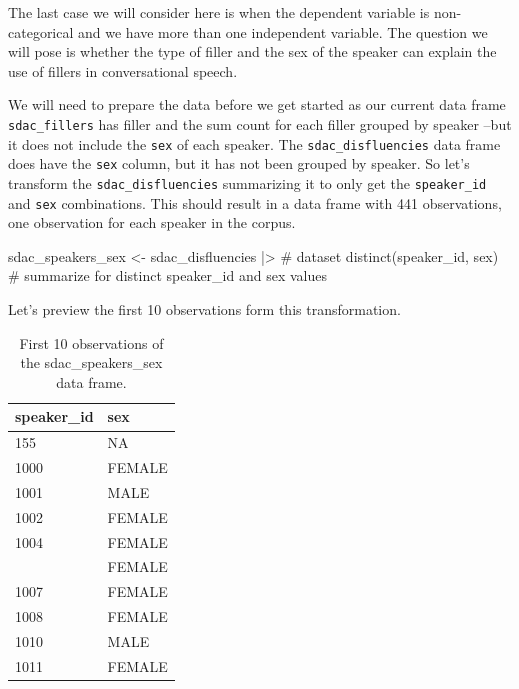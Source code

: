 \documentclass[
  letterpaper,
]{latex/krantz}
\newenvironment{Shaded}{\begin{snugshade}}{\end{snugshade}}
\newcommand{\CommentTok}[1]{\textcolor[rgb]{0.37,0.37,0.37}{#1}}
\newcommand{\FunctionTok}[1]{\textcolor[rgb]{0.28,0.35,0.67}{#1}}
\newcommand{\NormalTok}[1]{\textcolor[rgb]{0.00,0.23,0.31}{#1}}
\newcommand{\OtherTok}[1]{\textcolor[rgb]{0.00,0.23,0.31}{#1}}
\newcommand{\SpecialCharTok}[1]{\textcolor[rgb]{0.37,0.37,0.37}{#1}}
\begin{document}
The last case we will consider here is when the dependent variable is
non-categorical and we have more than one independent variable. The
question we will pose is whether the type of filler and the sex of the
speaker can explain the use of fillers in conversational speech.

We will need to prepare the data before we get started as our current
data frame \texttt{sdac\_fillers} has filler and the sum count for each
filler grouped by speaker --but it does not include the \texttt{sex} of
each speaker. The \texttt{sdac\_disfluencies} data frame does have the
\texttt{sex} column, but it has not been grouped by speaker. So let's
transform the \texttt{sdac\_disfluencies} summarizing it to only get the
\texttt{speaker\_id} and \texttt{sex} combinations. This should result
in a data frame with 441 observations, one observation for each speaker
in the corpus.

\begin{Shaded}
\begin{Highlighting}[]
\NormalTok{sdac\_speakers\_sex }\OtherTok{\textless{}{-}} 
\NormalTok{  sdac\_disfluencies }\SpecialCharTok{|\textgreater{}} \CommentTok{\# dataset}
  \FunctionTok{distinct}\NormalTok{(speaker\_id, sex) }\CommentTok{\# summarize for distinct \textasciigrave{}speaker\_id\textasciigrave{} and \textasciigrave{}sex\textasciigrave{} values}
\end{Highlighting}
\end{Shaded}

Let's preview the first 10 observations form this transformation.

\hypertarget{tbl-i-multi-cont-transform-sdac-preview}{}
\begin{table}
\caption{\label{tbl-i-multi-cont-transform-sdac-preview}First 10 observations of the sdac\_speakers\_sex data frame. }\tabularnewline

\centering
\begin{tabular}{ll}
\toprule
speaker\_id & sex\\
\midrule
155 & NA\\
1000 & FEMALE\\
1001 & MALE\\
1002 & FEMALE\\
1004 & FEMALE\\
\addlinespace
1005 & FEMALE\\
1007 & FEMALE\\
1008 & FEMALE\\
1010 & MALE\\
1011 & FEMALE\\
\bottomrule
\end{tabular}
\end{table}
\end{document}

